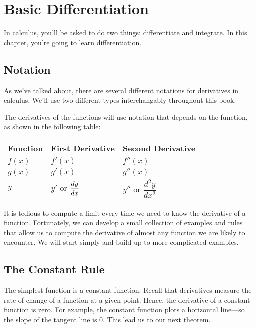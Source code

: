 \chapter{Basic Differentiation}

In calculus, you'll be asked to do two things: differentiate and integrate. In this chapter, you're going to learn differentiation.

\section{Notation}
As we've talked about, there are several different notations for derivatives in calculus. We'll use two different types interchangably throughout this book.

The derivatives of the functions will use notation that depends on the function, as shown in the following table:

\begin{table}[H]
    \centering
    \begin{tabular}{l l l}
        \toprule
        \textbf{Function} & \textbf{First Derivative} & \textbf{Second Derivative} \\
        \midrule
        $f(x)$      & $f'(x)$           & $f''(x)$\\
        $g(x)$      & $g'(x)$           & $g''(x)$\\
        $y$         & $y'$ or $\displaystyle\frac{dy}{dx}$   & $y''$ or $\dfrac{d^2y}{dx^2}$   \\
        \bottomrule
    \end{tabular}
\end{table}

It is tedious to compute a limit every time we need to know the
derivative of a function. Fortunately, we can develop a small
collection of examples and rules that allow us to compute the
derivative of almost any function we are likely to encounter. \cite{mooc} We will start simply and build-up to more complicated examples.

\section{The Constant Rule}

The simplest function is a constant function.  Recall that derivatives measure the rate of change of a function at a given point. Hence, the derivative of a constant function is zero. For example, the constant function plots a horizontal line---so the slope of the tangent line is $0$. \cite{mooc}
This lead us to our next theorem.

